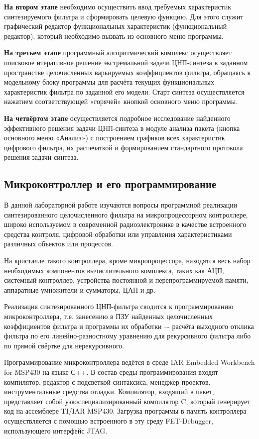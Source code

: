 \documentclass[a4paper,14pt]{extarticle}
\begin{document}
\textbf{На  втором этапе} необходимо осуществить ввод требуемых характеристик синтезируемого фильтра и сформировать целевую функцию. Для этого служит графический редактор функциональных характеристик (функциональный редактор), который необходимо вызвать из основного меню программы.

\textbf{На третьем этапе} программный алгоритмический комплекс осуществляет поисковое итеративное решение экстремальной задачи ЦНП-синтеза в заданном пространстве целочисленных варьируемых коэффициентов фильтра, обращаясь к модельному блоку программы для расчёта текущих функциональных характеристик фильтра по заданной его модели. Старт синтеза осуществляется нажатием соответствующей «горячей» кнопкой основного меню программы.

\textbf{На четвёртом этапе} осуществляется подробное исследование найденного эффективного решения задачи ЦНП-синтеза в модуле анализа пакета (кнопка основного меню «Анализ») с построением графиков всех характеристик цифрового фильтра, их распечаткой и формированием стандартного протокола решения задачи синтеза.

\subsection{Микроконтроллер и его программирование}

В данной лабораторной работе изучаются вопросы программной реализации синтезированного целочисленного фильтра на микропроцессорном контроллере, широко используемом в современной радиоэлектронике в качестве встроенного средства контроля, цифровой обработки или управления характеристиками различных объектов или процессов. 

На кристалле такого контроллера, кроме микропроцессора, находятся весь набор необходимых компонентов  вычислительного комплекса, таких как АЦП, системный контроллер, устройства постоянной и перепрограммируемой памяти, аппаратные умножители и сумматоры, ЦАП и др.

Реализация синтезированного ЦНП-фильтра сводится к программированию микроконтроллера, т.е. занесению в ПЗУ найденных целочисленных коэффициентов фильтра и программы их обработки –- расчёта выходного отклика фильтра по его линейно-разностному уравнению  для рекурсивного фильтра либо по прямой свёртке для нерекурсивного.

Программирование микроконтроллера ведётся в среде IAR Emb\-edd\-ed Wo\-rkbe\-nch for MSP430 на языке С++. 
В состав среды программирования входят компилятор, редактор с подсветкой синтаксиса, менеджер проектов, инструментальные средства отладки. Компилятор, входящий в пакет, представляет собой узкоспециализированный компилятор C, который генерирует код на ассемблере TI/IAR MSP430. Загрузка программы в память контроллера осуществляется с помощью встроенного в эту среду FET-Debugger, использующего интерфейс JTAG.
\newpage
\end{document}
